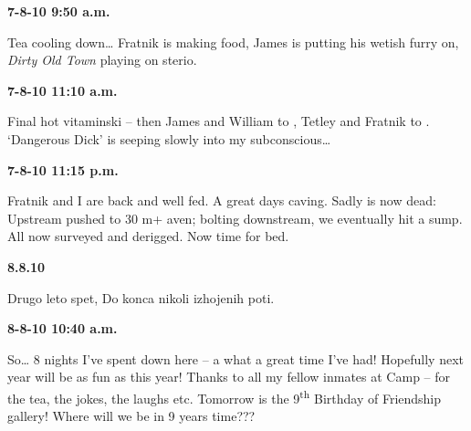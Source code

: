 

\textbf{7-8-10 9:50 a.m.}

Tea cooling down\ldots{} Fratnik is making food, James is putting his
wetish furry on, \textit{Dirty Old Town }playing on sterio.

\textbf{7-8-10 11:10 a.m.}

Final hot vitaminski -- then James and William to , Tetley and Fratnik to . `Dangerous Dick' is seeping slowly into my subconscious\ldots{}


\newpage
\textbf{7-8-10 11:15 p.m.}

Fratnik and I are back and well fed. A great days caving. Sadly  is now dead: Upstream pushed to 30 m+ aven; bolting downstream, we eventually hit a sump. All now surveyed and derigged. Now time for bed.


\textbf{8.8.10}

Drugo leto spet, Do konca nikoli izhojenih poti.


\textbf{8-8-10 10:40 a.m.}

So\ldots{} 8 nights I've spent down here -- a what a great time I've
had! Hopefully next year will be as fun as this year! Thanks to all my
fellow inmates at Camp  -- for the tea, the jokes, the
laughs etc. Tomorrow is the 9\textsuperscript{th} Birthday of Friendship
gallery! Where will we be in 9 years time???

